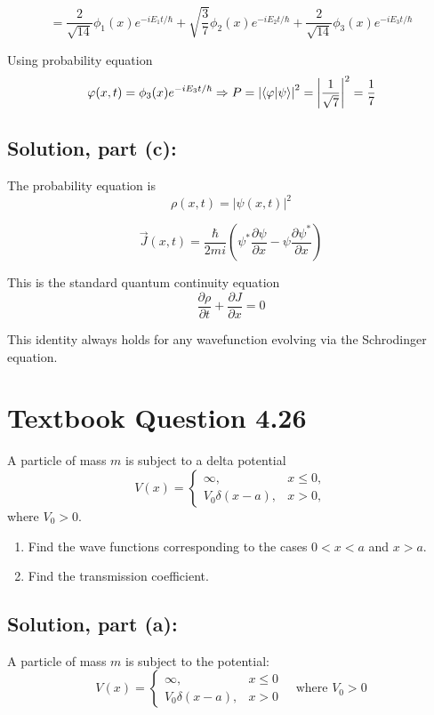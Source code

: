 \documentclass[12pt]{article}
\begin{document}
        \[
            = \frac{2}{\sqrt{14}} \phi_1(x) e^{-i E_1 t / \hbar} +
            \sqrt{\frac{3}{7}} \phi_2(x) e^{-i E_2 t / \hbar} +
            \frac{2}{\sqrt{14}} \phi_3(x) e^{-i E_3 t / \hbar}
        \]
        
        Using probability equation 
        \[
            \varphi(x,t) = \phi_3(x) e^{-i E_3 t / \hbar} \Rightarrow P = \left| \braket{\varphi}{\psi} \right|^2 = \left| \frac{1}{\sqrt{7}} \right|^2 = \frac{1}{7}
        \]
        
    \subsection{Solution, part (c):}
        The probability equation is 
        \[
            \rho(x,t) = |\psi(x,t)|^2 
        \]
        
        \[
            \vec{J}(x,t) = \frac{\hbar}{2 m i} \left( \psi^* \frac{\partial \psi}{\partial x} - \psi \frac{\partial \psi^*}{\partial x}\right)
        \]
        
        This is the standard quantum continuity equation
        \[
            \frac{\partial \rho}{\partial t} + \frac{\partial J}{\partial x} = 0
        \]

        This identity always holds for any wavefunction evolving via the Schrodinger equation.
        

\section{Textbook Question 4.26}
    A particle of mass \( m \) is subject to a delta potential
    \[
        V(x) = 
        \begin{cases}
        \infty, & x \leq 0, \\
        V_0 \delta(x - a), & x > 0,
        \end{cases}
    \]
    where \( V_0 > 0 \).
    
    \begin{enumerate}
        \item[(a)] Find the wave functions corresponding to the cases \( 0 < x < a \) and \( x > a \).
        \item[(b)] Find the transmission coefficient.
    \end{enumerate}

    \subsection{Solution, part (a):}
        A particle of mass \( m \) is subject to the potential:
        \[
            V(x) =
            \begin{cases}
            \infty, & x \leq 0 \\
            V_0 \delta(x - a), & x > 0
            \end{cases}
            \quad \text{where } V_0 > 0
        \]
               
\end{document}
